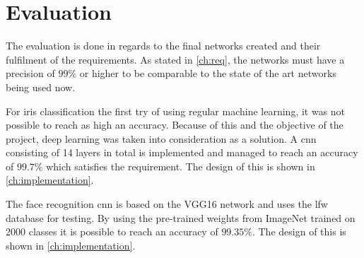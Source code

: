 \chapter{Evaluation}
The evaluation is done in regards to the final networks created and their fulfilment of the requirements. As stated in \autoref{ch:req}, the networks must have a precision of $99\%$ or higher to be comparable to the state of the art networks being used now.

For iris classification the first try of using regular machine learning, it was not possible to reach as high an accuracy. Because of this and the objective of the project, deep learning was taken into consideration as a solution. A \gls{cnn} consisting of 14 layers in total is implemented and managed to reach an accuracy of $99.7\%$ which satisfies the requirement. The design of this is shown in \autoref{ch:implementation}.

The face recognition \gls{cnn} is based on the VGG16 network and uses the \gls{lfw} database for testing. By using the pre-trained weights from ImageNet trained on 2000 classes it is possible to reach an accuracy of $99.35\%$. The design of this is shown in \autoref{ch:implementation}.
